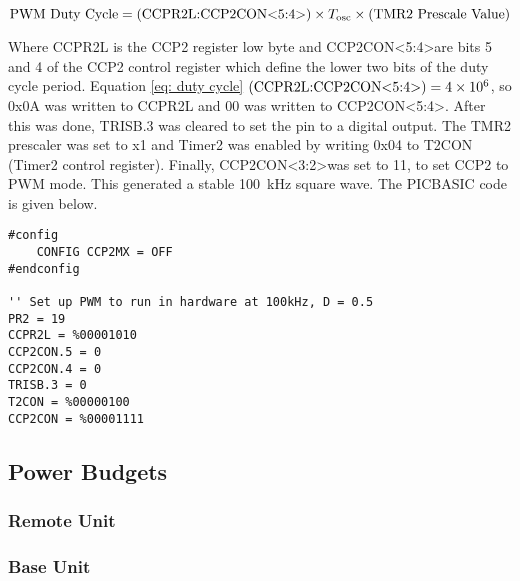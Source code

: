 \begin{equation}
\text{PWM Duty Cycle} = (\text{CCPR2L:CCP2CON\textless5:4\textgreater}) \times T_\text{osc} \times (\text{TMR2 Prescale Value}) \label{eq: duty cycle}
\end{equation}

Where CCPR2L is the CCP2 register low byte and CCP2CON\textless5:4\textgreater are bits 5 and 4 of the CCP2 control register which define the lower two bits of the duty cycle period. Equation \ref{eq: duty cycle} $(\text{CCPR2L:CCP2CON\textless5:4\textgreater}) = \num{4e6}$, so 0x0A was written to CCPR2L and 00 was written to CCP2CON\textless5:4\textgreater. After this was done, TRISB.3 was cleared to set the pin to a digital output. The TMR2 prescaler was set to x1 and Timer2 was enabled by writing 0x04 to T2CON (Timer2 control register). Finally, CCP2CON\textless3:2\textgreater was set to 11, to set CCP2 to PWM mode. This generated a stable \SI{100}{\kilo\hertz} square wave. The PICBASIC code is given below.\\
\begin{lstlisting}
#config
    CONFIG CCP2MX = OFF
#endconfig

'' Set up PWM to run in hardware at 100kHz, D = 0.5
PR2 = 19
CCPR2L = %00001010
CCP2CON.5 = 0
CCP2CON.4 = 0
TRISB.3 = 0
T2CON = %00000100
CCP2CON = %00001111
\end{lstlisting}





\subsection{Power Budgets}\label{power budget}
\subsubsection{Remote Unit}



\subsubsection{Base Unit}